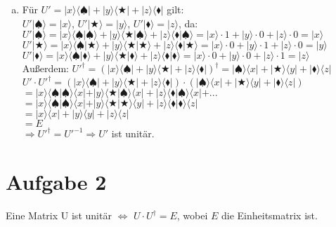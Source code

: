 \documentclass[a4paper]{scrartcl}
\begin{document}
\begin{enumerate}[a)]
\item Für $U'=|x\rangle\langle\spadesuit|+|y\rangle\langle\bigstar|+|z\rangle\langle\blacklozenge|$ gilt:\\
$U'|\spadesuit\rangle=|x\rangle$, $U'|\bigstar\rangle=|y\rangle$, $U'|\blacklozenge\rangle=|z\rangle$, da:\\
$U'|\spadesuit\rangle=|x\rangle\langle\spadesuit|\spadesuit\rangle+|y\rangle\langle\bigstar|\spadesuit\rangle+|z\rangle\langle\blacklozenge|\spadesuit\rangle = |x\rangle\cdot 1+|y\rangle\cdot 0+|z\rangle\cdot 0=|x\rangle$\\
$U'|\bigstar\rangle=|x\rangle\langle\spadesuit|\bigstar\rangle+|y\rangle\langle\bigstar|\bigstar\rangle+|z\rangle\langle\blacklozenge|\bigstar\rangle = |x\rangle\cdot 0+|y\rangle\cdot 1+|z\rangle\cdot 0=|y\rangle$\\
$U'|\blacklozenge\rangle=|x\rangle\langle\spadesuit|\blacklozenge\rangle+|y\rangle\langle\bigstar|\blacklozenge\rangle+|z\rangle\langle\blacklozenge|\blacklozenge\rangle = |x\rangle\cdot 0+|y\rangle\cdot 0+|z\rangle\cdot 1=|z\rangle$\\
Außerdem: $U'^{\dagger}=(|x\rangle\langle\spadesuit|+|y\rangle\langle\bigstar|+|z\rangle\langle\blacklozenge|)^{\dagger}=|\spadesuit\rangle\langle x|+|\bigstar\rangle\langle y|+|\blacklozenge\rangle\langle z|$\\
$U'\cdot U'^{\dagger}=(|x\rangle\langle\spadesuit|+|y\rangle\langle\bigstar|+|z\rangle\langle\blacklozenge|)\cdot(|\spadesuit\rangle\langle x|+|\bigstar\rangle\langle y|+|\blacklozenge\rangle\langle z|)$\\
$=|x\rangle\langle\spadesuit|\spadesuit\rangle\langle x|+|y\rangle\langle\bigstar|\spadesuit\rangle\langle x|+|z\rangle\langle\blacklozenge|\spadesuit\rangle\langle x|+...$\\
$=|x\rangle\langle\spadesuit|\spadesuit\rangle\langle x|+|y\rangle\langle\bigstar|\bigstar\rangle\langle y|+|z\rangle\langle\blacklozenge|\blacklozenge\rangle\langle z|$\\
$=|x\rangle\langle x|+|y\rangle\langle y|+|z\rangle\langle z|$\\
$=E$\\
$\Rightarrow U'^{\dagger} = U'^{-1} \Rightarrow U'$ ist unitär.


\end{enumerate}
\newpage
\section*{Aufgabe 2}
Eine Matrix U ist unitär $\Leftrightarrow$ $U\cdot U^{\dagger}=E$, wobei $E$ die Einheitsmatrix ist.\\\\
\end{document}
